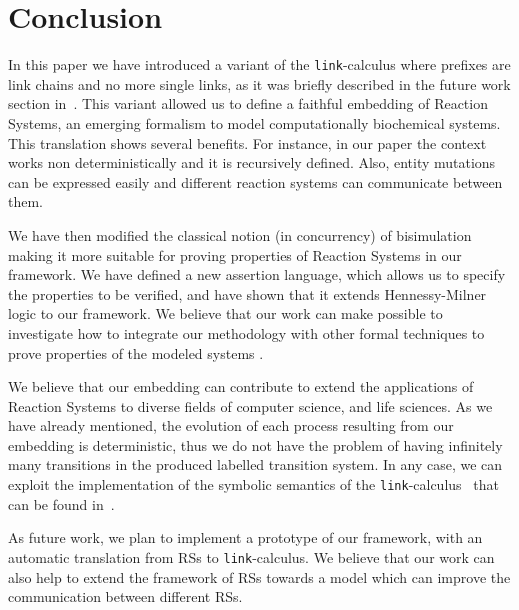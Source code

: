 
\section{Conclusion}\label{sec:conclusion}

In this paper we have introduced a variant of the {\tt link}-calculus
where prefixes are link chains and no more single links, as it was 
briefly described in the future work section in~\cite{BBB17}.
This variant allowed us to define 
a faithful embedding of Reaction Systems,
an emerging formalism to model computationally biochemical systems.
This translation shows several benefits.
For instance, in our paper the context works non deterministically and it 
is recursively defined.
Also, entity mutations can be expressed easily and different reaction systems can
communicate between them.

We have then modified the classical notion (in concurrency) of bisimulation
making it more suitable for proving properties of Reaction Systems in our
framework.
We have defined a new assertion language, which allows us to specify
the properties to be verified, and have shown that it extends Hennessy-Milner logic
to our framework.
We believe that our work can make 
possible to investigate how to integrate our methodology
with other formal techniques to prove 
properties of the modeled systems \cite{CFHOT15,OCHF16,BBGLBH2017}.

We believe that our embedding can contribute to extend the applications
of Reaction Systems to diverse fields of computer science, and life
sciences.
As we have already mentioned, the evolution of each process resulting from our embedding 
is deterministic, thus we do not have the problem of having infinitely many transitions
in the produced labelled transition system. In any case, we can exploit the implementation of  the symbolic semantics of the {\tt link}-calculus~\cite{BrodoO17} that can be found in~\cite{tool}.


As future work, we plan to implement a prototype of our framework,
with an automatic translation from RSs to  {\tt link}-calculus. 
We believe that our work can also help to extend the framework
of RSs towards a model which can improve the communication
between different RSs. 
